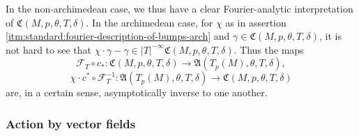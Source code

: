 \begin{remark}
  In the non-archimedean case, we thus have a clear Fourier-analytic interpretation of $\mathfrak{C}(M,p,\theta,T,\delta)$.  In the archimedean case, for $\chi$ as in assertion \eqref{itm:standard:fourier-description-of-bumps-arch} and $\gamma \in \mathfrak{C}(M,p,\theta,T,\delta)$, it is not hard to see that $\chi \cdot \gamma - \gamma \in |T|^{-\infty} \mathfrak{C}(M,p,\theta,T,\delta)$.  Thus the maps
  \begin{equation*}
    \mathcal{F}_T \circ c_* : \mathfrak{C}(M,p,\theta,T,\delta) \rightarrow \mathfrak{A}(T_p(M),\theta,T,\delta),
  \end{equation*}
  \begin{equation*}
    \chi \cdot c^* \circ \mathcal{F}_T^{-1}  : \mathfrak{A}(T_p(M),\theta,T,\delta) \rightarrow \mathfrak{C}(M,p,\theta,T,\delta)
  \end{equation*}
  are, in a certain sense, asymptotically inverse to one another.
\end{remark}

\subsubsection{Action by vector fields}

